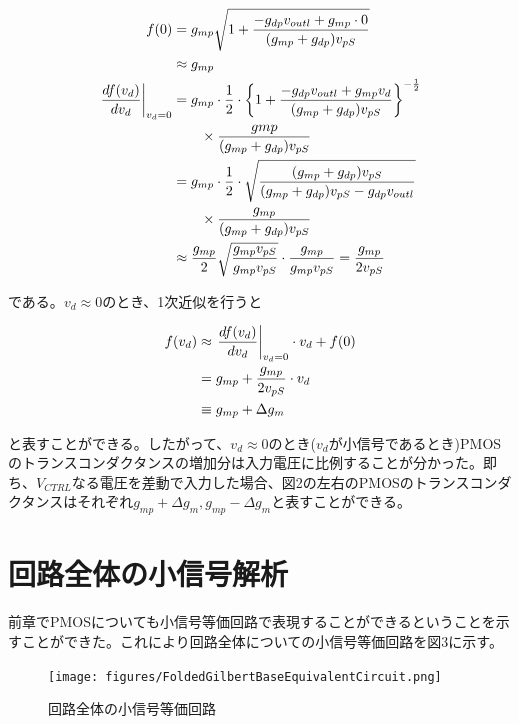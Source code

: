 \documentclass[twocolumn]{jsarticle}
\begin{document}
\begin{align}
    f(0)&=g_{mp}\sqrt{1+\frac{-g_{dp}v_{outl}+g_{mp}\cdot0}{(g_{mp}+g_{dp})v_{pS}}}\notag\\
    &\approx g_{mp} \notag \\
    \left.\frac{df(v_{d})}{dv_{d}}\right|_{v_{d}=0}&=g_{mp}\cdot\frac{1}{2}\cdot \left\{ 1+\frac{-g_{dp}v_{outl}+g_{mp}v_{d}}{(g_{mp}+g_{dp})v_{pS}} \right\} ^{-\frac{1}{2}}\notag\\
    &\qquad \times\frac{g{mp}}{(g_{mp}+g_{dp})v_{pS}}\notag\\
    &=g_{mp}\cdot\frac{1}{2}\cdot\sqrt{ \frac{(g_{mp}+g_{dp})v_{pS}}{ (g_{mp}+g_{dp})v_{pS}-g_{dp}v_{outl} } }\notag\\
    &\qquad \times\frac{g_{mp}}{(g_{mp}+g_{dp})v_{pS}}\notag\\
    &\approx\frac{g_{mp}}{2}\sqrt{ \frac{g_{mp}v_{pS}}{g_{mp}v_{pS}} }\cdot\frac{g_{mp}}{g_{mp}v_{pS}}=\frac{g_{mp}}{2v_{pS}} 
\end{align}

である。$v_{d}\approx0$のとき、1次近似を行うと

\begin{align}
    f(v_{d})&\approx\left.\frac{df(v_{d})}{dv_{d}}\right|_{v_{d}=0}\cdot v_{d}+f(0) \notag\\
    &=g_{mp}+\frac{g_{mp}}{2v_{pS}}\cdot v_{d} \notag\\
    &\equiv g_{mp}+\Delta g_{m}
\end{align}

と表すことができる。したがって、$v_{d}\approx0$のとき($v_{d}$が小信号であるとき)PMOSのトランスコンダクタンスの増加分は入力電圧に比例することが分かった。即ち、$V_{CTRL}$なる電圧を差動で入力した場合、図2の左右のPMOSのトランスコンダクタンスはそれぞれ$g_{mp}+\Delta g_{m},g_{mp}-\Delta g_{m}$と表すことができる。

\section{回路全体の小信号解析}
前章でPMOSについても小信号等価回路で表現することができるということを示すことができた。これにより回路全体についての小信号等価回路を図3に示す。

\begin{figure}[b]
    \begin{center}
        \texttt{[image: figures/FoldedGilbertBaseEquivalentCircuit.png]}
        \caption{回路全体の小信号等価回路}
    \end{center}
\end{figure}
\end{document}
